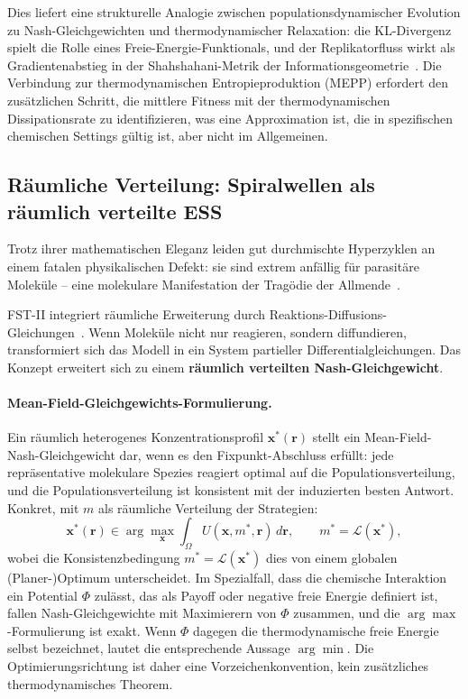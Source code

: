 \documentclass[12pt,a4paper]{article}
\theoremstyle{remark}
\begin{document}
Dies liefert eine strukturelle Analogie zwischen populationsdynamischer Evolution zu Nash-Gleichgewichten und thermodynamischer Relaxation: die KL-Divergenz spielt die Rolle eines Freie-Energie-Funktionals, und der Replikatorfluss wirkt als Gradientenabstieg in der Shahshahani-Metrik der Informationsgeometrie~\citep{ReplicatorEntropy}. Die Verbindung zur thermodynamischen Entropieproduktion (MEPP) erfordert den zusätzlichen Schritt, die mittlere Fitness mit der thermodynamischen Dissipationsrate zu identifizieren, was eine Approximation ist, die in spezifischen chemischen Settings gültig ist, aber nicht im Allgemeinen.

\subsection{Räumliche Verteilung: Spiralwellen als räumlich verteilte ESS}

Trotz ihrer mathematischen Eleganz leiden gut durchmischte Hyperzyklen an einem fatalen physikalischen Defekt: sie sind extrem anfällig für parasitäre Moleküle -- eine molekulare Manifestation der Tragödie der Allmende~\citep{HypercycleInfinite}.

FST-II integriert räumliche Erweiterung durch Reaktions-Diffusions-Gleichungen~\citep{ReplicatorDiffusion}. Wenn Moleküle nicht nur reagieren, sondern diffundieren, transformiert sich das Modell in ein System partieller Differentialgleichungen. Das Konzept erweitert sich zu einem \textbf{räumlich verteilten Nash-Gleichgewicht}.

\paragraph{Mean-Field-Gleichgewichts-Formulierung.}
Ein räumlich heterogenes Konzentrationsprofil $\mathbf{x}^*(\mathbf{r})$ stellt ein Mean-Field-Nash-Gleichgewicht dar, wenn es den Fixpunkt-Abschluss erfüllt: jede repräsentative molekulare Spezies reagiert optimal auf die Populationsverteilung, und die Populationsverteilung ist konsistent mit der induzierten besten Antwort. Konkret, mit $m$ als räumliche Verteilung der Strategien:
\begin{equation}
\mathbf{x}^*(\mathbf{r}) \in \arg\max_{\mathbf{x}} \int_\Omega U(\mathbf{x}, m^*, \mathbf{r}) \, d\mathbf{r}, \qquad m^* = \mathcal{L}(\mathbf{x}^*),
\end{equation}
wobei die Konsistenzbedingung $m^* = \mathcal{L}(\mathbf{x}^*)$ dies von einem globalen (Planer-)Optimum unterscheidet. Im Spezialfall, dass die chemische Interaktion ein Potential $\Phi$ zulässt, das als Payoff oder negative freie Energie definiert ist, fallen Nash-Gleichgewichte mit Maximierern von $\Phi$ zusammen, und die $\arg\max$-Formulierung ist exakt. Wenn $\Phi$ dagegen die thermodynamische freie Energie selbst bezeichnet, lautet die entsprechende Aussage $\arg\min$. Die Optimierungsrichtung ist daher eine Vorzeichenkonvention, kein zusätzliches thermodynamisches Theorem.
\end{document}
